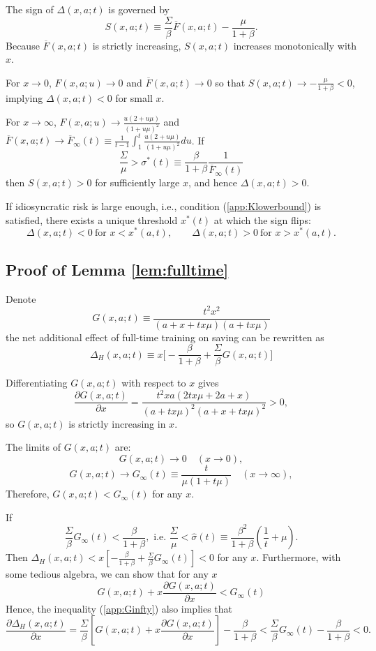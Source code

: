 \documentclass[12pt]{article}
\begin{document}
The sign of $\Delta(x,a;t)$ is governed by
\[
S(x,a;t)\equiv \frac{\Sigma}{\beta}\overline{F}(x,a;t)-\frac{\mu}{1+\beta}.
\]
Because $\overline{F}(x,a;t)$ is strictly increasing, $S(x,a;t)$ increases monotonically with $x$. 

For $x\to 0$, $F(x,a;u)\to 0$ and $\overline{F}(x,a;t) \to 0$ so that $S(x,a;t)\to - \frac{\mu}{1+\beta}<0$, implying $\Delta(x,a;t)<0$ for small $x$.

For $x\to \infty$, $F(x,a;u)\to \frac{u(2+u\mu)}{(1+u\mu)^2}$ and $\overline{F}(x,a;t) \to \overline{F}_\infty(t)\equiv \frac{1}{t-1}\int_1^t \frac{u(2+u\mu)}{(1+u\mu)^2} du$. If 
\begin{equation}
\frac{\Sigma}{\mu} > \sigma^*(t) \equiv \frac{\beta}{1+\beta}\frac{1}{\overline{F}_\infty(t)}
\label{app:Klowerbound}
\end{equation}
then $S(x,a;t)>0$ for sufficiently large $x$, and hence $\Delta(x,a;t)>0$.

If idiosyncratic risk is large enough, i.e., condition (\ref{app:Klowerbound}) is satisfied, there exists a unique threshold $x^\ast(t)$ at which the sign flips:
\[
    \Delta(x,a;t)<0\ \text{for }x<x^\ast(a,t),
\qquad
\Delta(x,a;t)>0\ \text{for }x>x^\ast(a,t).
\]




\subsection{Proof of Lemma \ref{lem:fulltime}}

Denote 
\[
G(x,a;t)\equiv \frac{t^2x^2}{(a+x+tx\mu)(a+tx\mu)}
\]
the net additional effect of full-time training on saving can be rewritten as 
\[
\Delta_H(x,a;t) \equiv  x\big[-\frac{\beta}{1+\beta} + \frac{\Sigma}{\beta}G(x,a;t)\big]
\]

Differentiating $G(x,a;t)$ with respect to $x$ gives
\[
\frac{\partial G(x,a;t)}{\partial x}
=
\frac{t^2xa(2tx\mu+2a+x)}{(a+ tx\mu)^2(a+x+tx\mu)^2}
>0,
\]
so $G(x,a;t)$ is strictly increasing in $x$.

The limits of $G(x,a;t)$ are:
\[
G(x,a;t) \to 0 \quad (x\to 0),
\]
\[
G(x,a;t) \to G_\infty(t)\equiv \frac{t}{\mu(1+t\mu)} \quad (x\to \infty),
\]
Therefore, $G(x,a;t)<G_\infty(t)$ for any $x$.

If 
\begin{equation} \label{app:Ginfty}
    \frac{\Sigma}{\beta}G_\infty(t)<\frac{\beta}{1+\beta}, \text{ i.e. } \frac{\Sigma}{\mu} < \hat{\sigma}(t) \equiv \frac{\beta^2}{1+\beta}(\frac{1}{t}+\mu).
\end{equation}
Then $\Delta_H(x,a;t)<x[-\frac{\beta}{1+\beta}+\frac{\Sigma}{\beta}G_\infty(t)]<0$ for any $x$. 
Furthermore, with some tedious algebra, we can show that for any $x$
\[
G(x,a;t)+x\frac{\partial G(x,a;t)}{\partial x}<G_\infty(t)
\]
Hence, the inequality (\ref{app:Ginfty}) also implies that
\begin{equation} 
    \frac{\partial \Delta_H(x,a;t)}{\partial x} = \frac{\Sigma}{\beta}[G(x,a;t)+x\frac{\partial G(x,a;t)}{\partial x}] - \frac{\beta}{1+\beta} < \frac{\Sigma}{\beta} G_\infty(t) - \frac{\beta}{1+\beta} < 0.
\end{equation}
\end{document}
